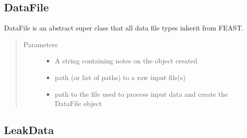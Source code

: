 \documentclass[letterpaper,10pt,english]{sphinxmanual}
\begin{document}
\subsection{DataFile}
\label{\detokenize{index:datafile}}

\begin{fulllineitems}
\label{\detokenize{index:feast.input_data_classes.DataFile}}
DataFile is an abstract super class that all data file types inherit from FEAST.
\begin{quote}\begin{description}
\item[{Parameters}] \leavevmode\begin{itemize}
\item {} 
 \textendash{} A string containing notes on the object created

\item {} 
 \textendash{} path (or list of paths) to a raw input file(s)

\item {} 
 \textendash{} path to the file used to process input data and create the DataFile object

\end{itemize}

\end{description}\end{quote}

\end{fulllineitems}



\subsection{LeakData}
\label{\detokenize{index:leakdata}}
\end{document}
